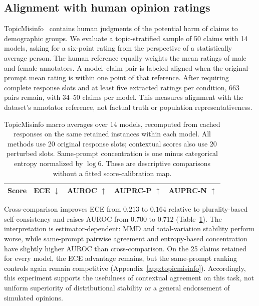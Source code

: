 \documentclass[11pt]{article}
\theoremstyle{plain}
\theoremstyle{definition}
\theoremstyle{remark}
\newif\ifrevisionmarkup
\DeclareRobustCommand{\revisioncolor}{\ifrevisionmarkup\color{red}\fi}
\newenvironment{revision}{\par\begingroup\revisioncolor}{\par\endgroup}
\begin{document}
\begin{revision}
\subsection{Alignment with human opinion ratings}
\label{sec:opinion}
TopicMisinfo~\citep{neumann2026opinions} contains human judgments of the potential harm of claims to demographic groups. We evaluate a topic-stratified sample of 50 claims with 14 models, asking for a six-point rating from the perspective of a statistically average person. The human reference equally weights the mean ratings of male and female annotators. A model--claim pair is labeled aligned when the original-prompt mean rating is within one point of that reference. After requiring complete response slots and at least five extracted ratings per condition, 663 pairs remain, with 34--50 claims per model. This measures alignment with the dataset's annotator reference, not factual truth or population representativeness.
\end{revision}


\begin{table}[t]
\centering\small\revisioncolor
\begin{tabular}{lrrrr}
\toprule
Score & ECE $\downarrow$ & AUROC $\uparrow$ & AUPRC-P $\uparrow$ & AUPRC-N $\uparrow$\\
\midrule

\bottomrule
\end{tabular}
\caption{TopicMisinfo macro averages over 14 models, recomputed from cached responses on the same retained instances within each model. All methods use 20 original response slots; contextual scores also use 20 perturbed slots. Same-prompt concentration is one minus categorical entropy normalized by $\log 6$. These are descriptive comparisons without a fitted score-calibration map.}
\label{tab:topicmisinfo}
\end{table}
\begin{revision}
Cross-comparison improves ECE from $0.213$ to $0.164$ relative to plurality-based self-consistency and raises AUROC from $0.700$ to $0.712$ (Table~\ref{tab:topicmisinfo}). The interpretation is estimator-dependent: MMD and total-variation stability perform worse, while same-prompt pairwise agreement and entropy-based concentration have slightly higher AUROC than cross-comparison. On the 25 claims retained for every model, the ECE advantage remains, but the same-prompt ranking controls again remain competitive (Appendix~\ref{app:topicmisinfo}). Accordingly, this experiment supports the usefulness of contextual agreement on this task, not uniform superiority of distributional stability or a general endorsement of simulated opinions.
\end{revision}
\end{document}
